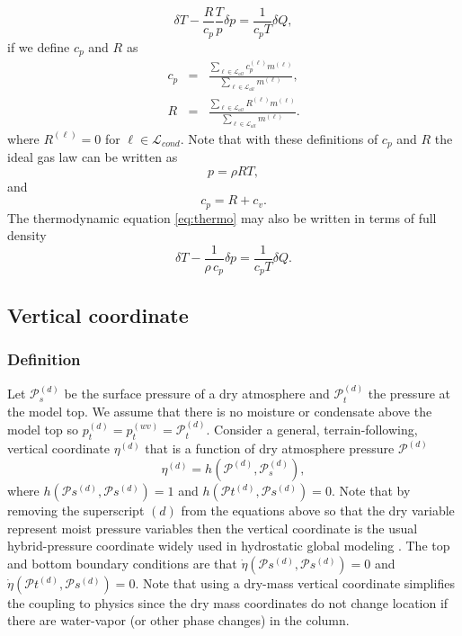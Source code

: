 \documentclass{agujournal}
\begin{document}
{\begin{equation}
\delta T-\frac{R}{c_p}\frac{T}{p}\delta p=\frac{1}{c_p T}\delta Q\label{eq:thermo},
\end{equation}
if we define $c_p$ and $R$ as
\begin{eqnarray}
c_p&=&\frac{\sum_{\ell \in \mathcal{L}_{all}} c_p^{(\ell)}m^{(\ell)}}{\sum_{\ell \in \mathcal{L}_{all}} m^{(\ell)}},\label{eq:cp} \\
R  &=&\frac{\sum_{\ell \in \mathcal{L}_{all}} R^{(\ell)} m^{(\ell)}}{\sum_{\ell \in \mathcal{L}_{all}} m^{(\ell)}}.
\end{eqnarray}
where $R^{(\ell)}=0$ for $\ell \in \mathcal{L}_{cond}$. Note that with these definitions of $c_p$ and $R$ the ideal gas law can be written as
\begin{equation}
p=\rho R T,\label{eq:ig4}
\end{equation}
and 
\begin{equation}
c_p=R+c_v.
\end{equation}
The thermodynamic equation \eqref{eq:thermo} may also be written in terms of full density
\begin{equation}
\delta T-\frac{1}{\rho\, c_p}\delta p=\frac{1}{c_p T}\delta Q\label{eq:thermo2}.
\end{equation}
%
\subsection{Vertical coordinate}\label{eq:vertical_coord}
\subsubsection{Definition}
Let $\mathcal{P}^{(d)}_s$ be the surface pressure of a dry atmosphere  and $\mathcal{P}_t^{(d)}$ the pressure at the model top. We assume that there is no moisture or condensate above the model top so $p_t^{(d)}=p_t^{(wv)}=\mathcal{P}_t^{(d)}$. Consider a general, terrain-following, vertical coordinate $\eta^{(d)}$ that is a function of dry atmosphere pressure $\mathcal{P}^{(d)}$ 
\begin{equation}
\eta^{(d)}=h(\mathcal{P}^{(d)},\mathcal{P}_s^{(d)}),
\end{equation}
where $h(\mathcal{P}s^{(d)},\mathcal{P}s^{(d)})=1$ and $h(\mathcal{P}t^{(d)},\mathcal{P}s^{(d)})=0$. Note that by removing the superscript $(d)$ from the equations above so that the dry variable represent moist pressure variables then the vertical coordinate is the usual hybrid-pressure coordinate widely used in hydrostatic global modeling \citep{SB1981MWR}. The top and bottom boundary conditions are that $\dot{\eta}\left({\mathcal{P}s^{(d)},\mathcal{P}s^{(d)}}\right)=0$ and $\dot{\eta}\left( \mathcal{P}t^{(d)},\mathcal{P}s^{(d)}\right)=0$. Note that using a dry-mass vertical coordinate simplifies the coupling to physics since the dry mass coordinates do not change location if there are water-vapor (or other phase changes) in the column.
}
\end{document}
